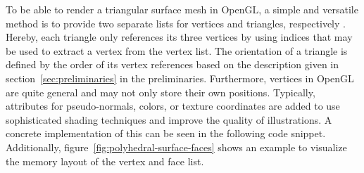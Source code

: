 \documentclass{stdlocal}
\begin{document}
  To be able to render a triangular surface mesh in OpenGL, a simple and versatile method is to provide two separate lists for vertices and triangles, respectively \autocite{opengl}.
  Hereby, each triangle only references its three vertices by using indices that may be used to extract a vertex from the vertex list.
  The orientation of a triangle is defined by the order of its vertex references based on the description given in section~\ref{sec:preliminaries} in the preliminaries.
  Furthermore, vertices in OpenGL are quite general and may not only store their own positions.
  Typically, attributes for pseudo-normals, colors, or texture coordinates are added to use sophisticated shading techniques and improve the quality of illustrations.
  A concrete implementation of this can be seen in the following code snippet.
  Additionally, figure~\ref{fig:polyhedral-surface-faces} shows an example to visualize the memory layout of the vertex and face list.
\end{document}
